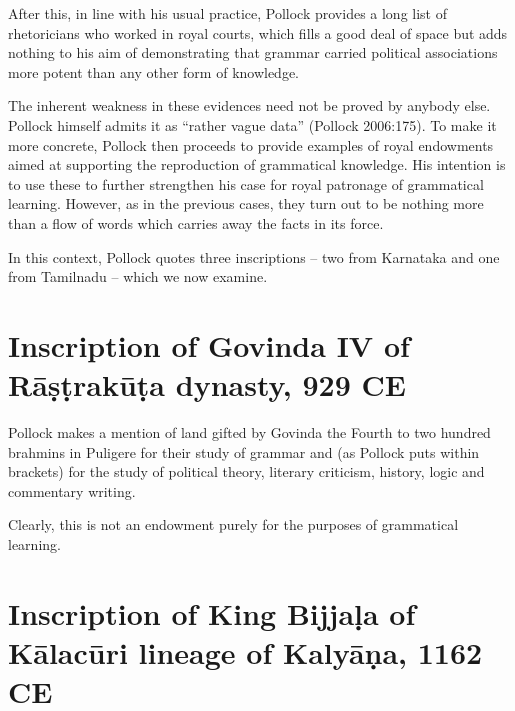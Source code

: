 \newpage

After this, in line with his usual practice, Pollock provides a long list of rhetoricians who worked in royal courts, which fills a good deal of space but adds nothing to his aim of demonstrating that grammar carried political associations more potent than any other form of knowledge.

The inherent weakness in these evidences need not be proved by anybody else. Pollock himself admits it as ``rather vague data'' (Pollock 2006:175). To make it more concrete, Pollock then proceeds to provide examples of royal endowments aimed at supporting the reproduction of grammatical knowledge. His intention is to use these to further strengthen his case for royal patronage of grammatical learning. However, as in the previous cases, they turn out to be nothing more than a flow of words which carries away the facts in its force.

In this context, Pollock quotes three inscriptions -- two from Karnataka and one from Tamilnadu -- which we now examine.

\section{Inscription of Govinda IV of Rāṣṭrakūṭa dynasty, 929 CE}\label{chap3-sec16}

Pollock makes a mention of land gifted by Govinda the Fourth to two hundred brahmins in Puligere for their study of grammar and (as Pollock puts within brackets) for the study of political theory, literary criticism, history, logic and commentary writing. 

Clearly, this is not an endowment purely for the purposes of grammatical learning.

\section{Inscription of King Bijjaḷa of Kālacūri lineage of Kalyāṇa, 1162 CE}\label{chap3-sec17}

